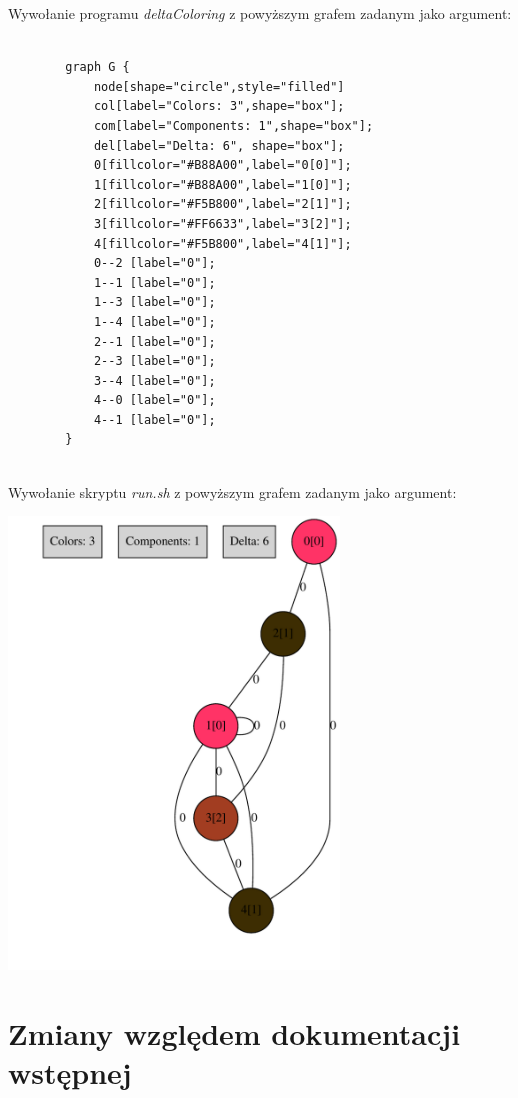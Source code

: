 \documentclass[a4paper]{article}
\begin{document}
	Wywołanie programu {\em deltaColoring} z powyższym grafem zadanym jako argument:

	\begin{verbatim}

		graph G {
			node[shape="circle",style="filled"]
			col[label="Colors: 3",shape="box"];
			com[label="Components: 1",shape="box"];
			del[label="Delta: 6", shape="box"];
			0[fillcolor="#B88A00",label="0[0]"];
			1[fillcolor="#B88A00",label="1[0]"];
			2[fillcolor="#F5B800",label="2[1]"];
			3[fillcolor="#FF6633",label="3[2]"];
			4[fillcolor="#F5B800",label="4[1]"];
			0--2 [label="0"];
			1--1 [label="0"];
			1--3 [label="0"];
			1--4 [label="0"];
			2--1 [label="0"];
			2--3 [label="0"];
			3--4 [label="0"];
			4--0 [label="0"];
			4--1 [label="0"];
		}


	\end{verbatim}

	Wywołanie skryptu {\em run.sh} z powyższym grafem zadanym jako argument:
	
	\begin{center}

		\includegraphics[height=12cm]{i1.pdf}

	\end{center}

	\section{Zmiany względem dokumentacji wstępnej}
\end{document}
